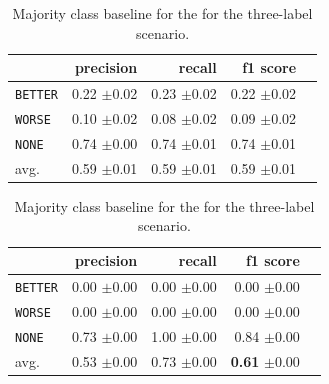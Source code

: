 \begin{table}[!htb]
	\begin{minipage}{.5\linewidth}
		\caption{Random (stratified) baseline for the three-label scenario.}
		\label{tbl:3stratifiedbaseline}
		\centering
		      
		\begin{tabularx}{0.97\linewidth}{Xrrrr}
			\toprule
			                & precision                    & recall                       & f1 score                     \\ \midrule 
			\texttt{BETTER} & 0.22 \scriptsize{$\pm$0.02} & 0.23 \scriptsize{$\pm$0.02} & 0.22 \scriptsize{$\pm$0.02} \\ 
			\texttt{WORSE}  & 0.10 \scriptsize{$\pm$0.02} & 0.08 \scriptsize{$\pm$0.02} & 0.09 \scriptsize{$\pm$0.02} \\ 
			\texttt{NONE}   & 0.74 \scriptsize{$\pm$0.00}  & 0.74 \scriptsize{$\pm$0.01} & 0.74 \scriptsize{$\pm$0.01} \\ 
			avg.         & 0.59 \scriptsize{$\pm$0.01} & 0.59 \scriptsize{$\pm$0.01} & 0.59 \scriptsize{$\pm$0.01} \\ 
			\bottomrule
		\end{tabularx} 
		
	\end{minipage}%
	\begin{minipage}{.5\linewidth}
		\centering
		\caption{Majority class baseline for the  for the three-label scenario.}
		\label{tbl:3majoritybaseline}
		\begin{tabularx}{0.97\linewidth}{Xrrrr}
			\toprule
			                & precision                    & recall                       & f1 score                                    \\ \midrule 
			\texttt{BETTER} & 0.00 \scriptsize{$\pm$0.00} & 0.00 \scriptsize{$\pm$0.00} & 0.00 \scriptsize{$\pm$0.00}                \\ 
			\texttt{WORSE}  & 0.00 \scriptsize{$\pm$0.00} & 0.00 \scriptsize{$\pm$0.00} & 0.00 \scriptsize{$\pm$0.00}                \\ 
			\texttt{NONE}   & 0.73 \scriptsize{$\pm$0.00}     & 1.00 \scriptsize{$\pm$0.00} & 0.84 \scriptsize{$\pm$0.00}                \\ 
			avg.         & 0.53 \scriptsize{$\pm$0.00} & 0.73 \scriptsize{$\pm$0.00} & \textbf{0.61} \scriptsize{$\pm$0.00} \\ 
			\bottomrule
		\end{tabularx}
	\end{minipage} 
\end{table}


